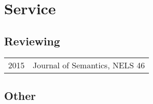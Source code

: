 \documentclass[11pt,letterpaper,twoside]{article}
\makeatletter
\newenvironment{cvsection}{%
  \renewcommand{\arraystretch}{1.75}
  \begin{longtable}[l]{@{} L R @{}}
}{%
  \end{longtable}
}
\makeatother
\begin{document}
\clearpage

\section*{Service}

\subsection*{Reviewing}

\begin{cvsection}
  2015 & Journal of Semantics, NELS 46
\end{cvsection}

\subsection*{Other}
\end{document}
